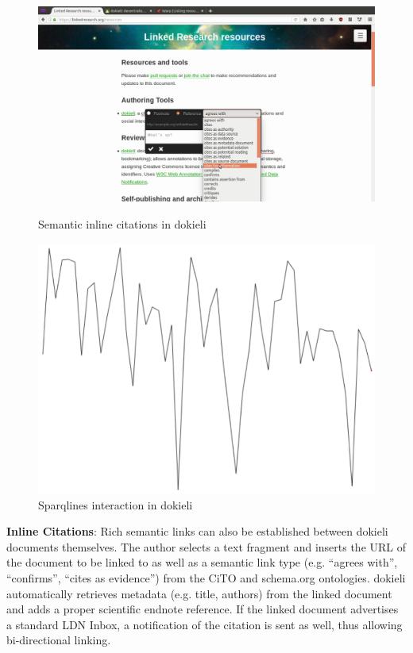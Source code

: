 \documentclass[a4paper]{llncs}
\begin{document}
\begin{figure}
  \begin{minipage}[b]{.53\textwidth}
    \includegraphics[width=\textwidth]{media/images/dokieli-citation}
    \caption{Semantic inline citations in dokieli}
    \label{fig:dokieli-citation}
  \end{minipage}
  \hfill
  \begin{minipage}[b]{.45\textwidth}
    \includegraphics[width=\textwidth]{media/images/dokieli-sparqlines}
    \caption{Sparqlines interaction in dokieli}
    \label{fig:dokieli-sparqlines}
  \end{minipage}
\end{figure}


\par \textbf{Inline Citations}: Rich semantic links can also be established between dokieli documents themselves.
                                    The author selects a text fragment and inserts the URL of the document to be linked to as well as a semantic link type (e.g. “agrees with”, “confirms”, “cites as evidence”) from the CiTO and schema.org ontologies. dokieli automatically retrieves metadata (e.g. title, authors) from the linked document and adds a proper scientific endnote reference. If the linked document advertises a standard LDN Inbox, a notification of the citation is sent as well, thus allowing bi-directional linking.
                                    
\end{document}
